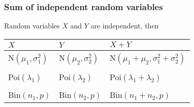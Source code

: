 \documentclass[slidestop,compress,mathserif]{beamer}
\begin{document}
%
%
%
%
%


\begin{frame}\frametitle{Sum of independent random variables }

Random variables $X$ and $Y$ are independent, then
\begin{center}
\begin{tabular}{lll}
\hline
$X$\rule{0pt}{3ex}							& $Y$ 						& $X + Y$\\
\hline
N$(\mu_1, \sigma^2_1)$ \rule{0pt}{3ex}		& N$(\mu_2, \sigma^2_2)$	&N$(\mu_1 + \mu_2, \sigma^2_1+\sigma^2_2)$\\
&&\\
Poi$(\lambda_1)$	\rule{0pt}{3ex}			& Poi$(\lambda_2)$			& Poi$(\lambda_1 + \lambda_2)$\\
&&\\
Bin$(n_1, p)$	\rule{0pt}{3ex}				& Bin$(n_2, p)$			& Bin$(n_1 + n_2, p)$\\
\hline
\end{tabular}
\end{center}



\end{frame}
\end{document}
